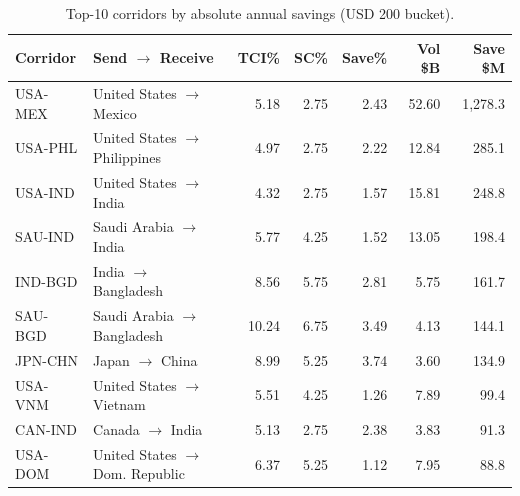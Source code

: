 \documentclass[
  11pt,
]{article}
\begin{document}
\begin{table}[h]
\centering
\caption{Top-10 corridors by absolute annual savings (USD 200 bucket).}
\small
\begin{tabular}{llrrrrr}
\toprule
\textbf{Corridor} & \textbf{Send $\to$ Receive} & \textbf{TCI\%} & \textbf{SC\%} & \textbf{Save\%} & \textbf{Vol \$B} & \textbf{Save \$M} \\
\midrule
USA-MEX & United States $\to$ Mexico        & 5.18 & 2.75 & 2.43 & 52.60 & 1{,}278.3 \\
USA-PHL & United States $\to$ Philippines   & 4.97 & 2.75 & 2.22 & 12.84 &    285.1 \\
USA-IND & United States $\to$ India         & 4.32 & 2.75 & 1.57 & 15.81 &    248.8 \\
SAU-IND & Saudi Arabia $\to$ India          & 5.77 & 4.25 & 1.52 & 13.05 &    198.4 \\
IND-BGD & India $\to$ Bangladesh            & 8.56 & 5.75 & 2.81 &  5.75 &    161.7 \\
SAU-BGD & Saudi Arabia $\to$ Bangladesh     & 10.24 & 6.75 & 3.49 &  4.13 &    144.1 \\
JPN-CHN & Japan $\to$ China                 & 8.99 & 5.25 & 3.74 &  3.60 &    134.9 \\
USA-VNM & United States $\to$ Vietnam       & 5.51 & 4.25 & 1.26 &  7.89 &     99.4 \\
CAN-IND & Canada $\to$ India                & 5.13 & 2.75 & 2.38 &  3.83 &     91.3 \\
USA-DOM & United States $\to$ Dom. Republic & 6.37 & 5.25 & 1.12 &  7.95 &     88.8 \\
\bottomrule
\end{tabular}
\end{table}
\end{document}
